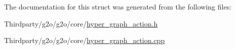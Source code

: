 The documentation for this struct was generated from the following files\+:\begin{DoxyCompactItemize}
\item 
Thirdparty/g2o/g2o/core/\mbox{\hyperlink{hyper__graph__action_8h}{hyper\+\_\+graph\+\_\+action.\+h}}\item 
Thirdparty/g2o/g2o/core/\mbox{\hyperlink{hyper__graph__action_8cpp}{hyper\+\_\+graph\+\_\+action.\+cpp}}\end{DoxyCompactItemize}
